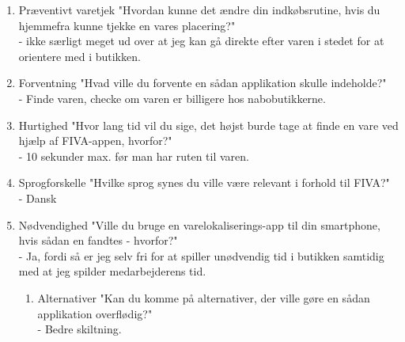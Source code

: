 \documentclass[a4paper,11pt]{report}
\begin{document}
\begin{enumerate}
\item Præventivt varetjek "Hvordan kunne det ændre din indkøbsrutine, hvis du hjemmefra kunne tjekke en vares placering?"\\
  - ikke særligt meget ud over at jeg kan gå direkte efter varen i stedet for at orientere med i butikken.
\item Forventning "Hvad ville du forvente en sådan applikation skulle indeholde?"\\
  - Finde varen, checke om varen er billigere hos nabobutikkerne. 
\item Hurtighed	"Hvor lang tid vil du sige, det højst burde tage at finde en vare ved hjælp af FIVA-appen, hvorfor?"\\
  - 10 sekunder max. før man har ruten til varen.
\item Sprogforskelle "Hvilke sprog synes du ville være relevant i forhold til FIVA?"\\
  - Dansk
\item Nødvendighed "Ville du bruge en varelokaliserings-app til din smartphone, hvis sådan en fandtes - hvorfor?"\\
  - Ja, fordi så er jeg selv fri for at spiller unødvendig tid i butikken samtidig med at jeg spilder medarbejderens tid.
\begin{enumerate}
\item Alternativer "Kan du komme på alternativer, der ville gøre en sådan applikation overflødig?"\\
  - Bedre skiltning.
\end{enumerate}

\end{enumerate}
\end{document}
